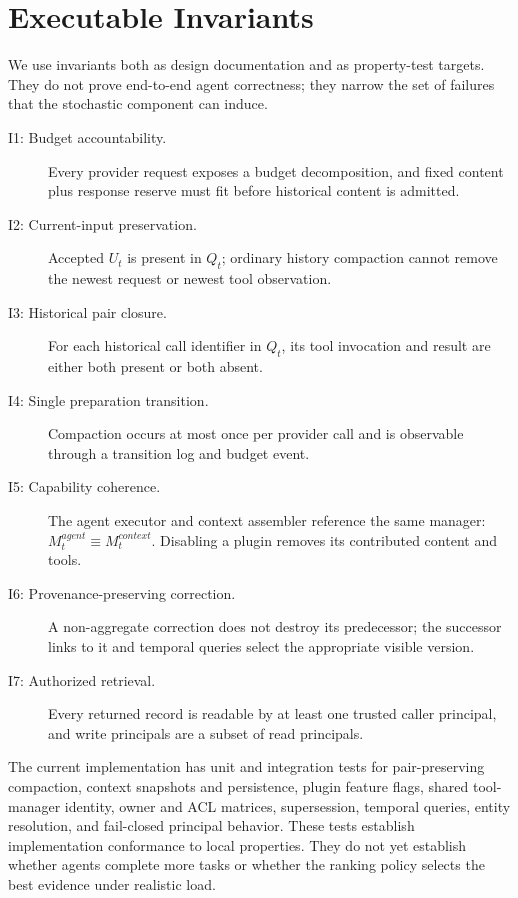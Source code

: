 \documentclass[sigplan,10pt,anonymous,review]{acmart}
\begin{document}
\section{Executable Invariants}

We use invariants both as design documentation and as property-test targets.
They do not prove end-to-end agent correctness; they narrow the set of failures
that the stochastic component can induce.

\begin{description}
  \item[I1: Budget accountability.] Every provider request exposes a budget
  decomposition, and fixed content plus response reserve must fit before
  historical content is admitted.

  \item[I2: Current-input preservation.] Accepted $U_t$ is present in $Q_t$;
  ordinary history compaction cannot remove the newest request or newest tool
  observation.

  \item[I3: Historical pair closure.] For each historical call identifier in
  $Q_t$, its tool invocation and result are either both present or both absent.

  \item[I4: Single preparation transition.] Compaction occurs at most once per
  provider call and is observable through a transition log and budget event.

  \item[I5: Capability coherence.] The agent executor and context assembler
  reference the same manager: $M_t^{agent} \equiv M_t^{context}$.  Disabling a
  plugin removes its contributed content and tools.

  \item[I6: Provenance-preserving correction.] A non-aggregate correction does
  not destroy its predecessor; the successor links to it and temporal queries
  select the appropriate visible version.

  \item[I7: Authorized retrieval.] Every returned record is readable by at
  least one trusted caller principal, and write principals are a subset of read
  principals.
\end{description}

The current implementation has unit and integration tests for pair-preserving
compaction, context snapshots and persistence, plugin feature flags, shared
tool-manager identity, owner and ACL matrices, supersession, temporal queries,
entity resolution, and fail-closed principal behavior.  These tests establish
implementation conformance to local properties.  They do not yet establish
whether agents complete more tasks or whether the ranking policy selects the
best evidence under realistic load.
\end{document}
